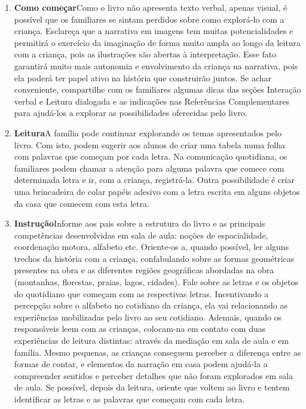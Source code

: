 \documentclass[11pt]{extarticle}
\begin{document}
\begin{enumerate}
\item \textbf{Como começar}\quad Como o livro não apresenta 
texto verbal, apenas visual, é possível que os familiares se sintam 
perdidos sobre como explorá-lo com a criança. Esclareça que a narrativa 
em imagens tem muitas potencialidades e permitirá o exercício da imaginação 
de forma muito ampla ao longo da leitura com a criança, pois as ilustrações são 
abertas à interpretação. Esse fato garantirá muito mais autonomia e 
envolvimento da criança na narrativa, pois ela poderá ter papel ativo na 
história que construirão juntos. Se achar conveniente, compartilhe com 
os familiares algumas dicas das seções Interação verbal 
e Leitura dialogada e as indicações nas Referências Complementares 
para ajudá-los a explorar as possibilidades oferecidas pelo livro. 

\item \textbf{Leitura}\quad A família pode continuar 
explorando os temas apresentados pelo livro. Com isto, podem sugerir
aos alunos de criar uma tabela numa folha com palavras que começam por cada
letra. Na comunicação quotidiana, os familiares podem chamar a atenção para
alguma palavra que comece com determinada letra e ir, com a criança, 
registrá-la. Outra possibilidade é criar uma brincadeira de colar papéis 
adesivo com a letra escrita em alguns objetos da casa que comecem com esta letra. 

\item \textbf{Instrução}\quad Informe aos pais sobre a estrutura do livro e as principais competências desenvolvidas em sala de aula: noções de espacialidade, coordenação motora, alfabeto etc.
Oriente-os a, quando possível, ler alguns trechos da história com a criança, confabulando sobre as formas geométricas presentes na obra e as diferentes regiões geográficas abordadas na obra (montanhas, florestas, praias, lagos, cidades).
Fale sobre as letras e os objetos do quotidiano que começam com as respectivas letras.
Incentivando a percepção sobre o alfabeto no cotidiano da criança, ela vai relacionando as experiências mobilizadas pelo livro ao seu cotidiano.
Ademais, quando os responsáveis leem com as crianças, colocam-na em contato com duas experiências de leitura distintas: através da mediação em sala de aula e em família. 
Mesmo pequenas, as crianças conseguem perceber a diferença entre 
as formas de contar, e elementos da narração em casa podem ajudá-la a compreender 
sentidos e perceber detalhes que não foram explorados em sala de aula. Se possível, depois da leitura, oriente 
que voltem ao livro e tentem identificar as letras e as palavras que começam com cada letra.


\end{enumerate}
\end{document}
